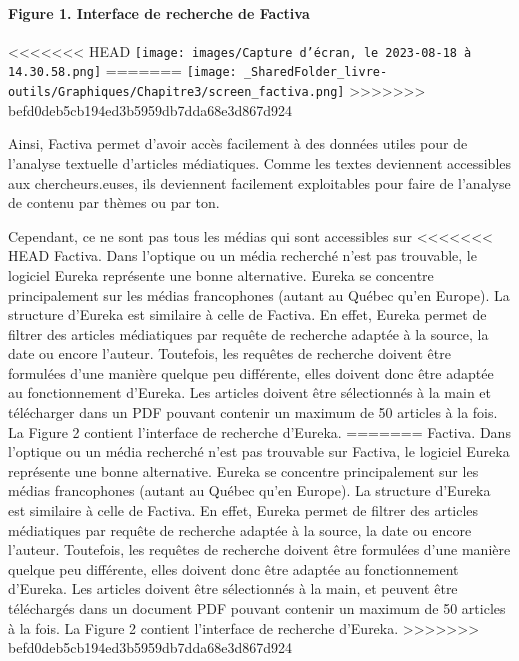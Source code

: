 \documentclass[
  letterpaper,
]{scrbook}
\let\oldparagraph\paragraph
\renewcommand{\paragraph}[1]{\oldparagraph{#1}\mbox{}}
\begin{document}
\hypertarget{figure-1.-interface-de-recherche-de-factiva}{%
\paragraph{Figure 1. Interface de recherche de
Factiva}\label{figure-1.-interface-de-recherche-de-factiva}}

<<<<<<< HEAD
\texttt{[image: images/Capture d’écran, le 2023-08-18 à 14.30.58.png]}
=======
\texttt{[image: \_SharedFolder\_livre-outils/Graphiques/Chapitre3/screen\_factiva.png]}
>>>>>>> befd0deb5cb194ed3b5959db7dda68e3d867d924

Ainsi, Factiva permet d'avoir accès facilement à des données utiles pour
de l'analyse textuelle d'articles médiatiques. Comme les textes
deviennent accessibles aux chercheurs.euses, ils deviennent facilement
exploitables pour faire de l'analyse de contenu par thèmes ou par ton.

Cependant, ce ne sont pas tous les médias qui sont accessibles sur
<<<<<<< HEAD
Factiva. Dans l'optique ou un média recherché n'est pas trouvable, le
logiciel Eureka représente une bonne alternative. Eureka se concentre
principalement sur les médias francophones (autant au Québec qu'en
Europe). La structure d'Eureka est similaire à celle de Factiva. En
effet, Eureka permet de filtrer des articles médiatiques par requête de
recherche adaptée à la source, la date ou encore l'auteur. Toutefois,
les requêtes de recherche doivent être formulées d'une manière quelque
peu différente, elles doivent donc être adaptée au fonctionnement
d'Eureka. Les articles doivent être sélectionnés à la main et
télécharger dans un PDF pouvant contenir un maximum de 50 articles à la
fois. La Figure 2 contient l'interface de recherche d'Eureka.
=======
Factiva. Dans l'optique ou un média recherché n'est pas trouvable sur
Factiva, le logiciel Eureka représente une bonne alternative. Eureka se
concentre principalement sur les médias francophones (autant au Québec
qu'en Europe). La structure d'Eureka est similaire à celle de Factiva.
En effet, Eureka permet de filtrer des articles médiatiques par requête
de recherche adaptée à la source, la date ou encore l'auteur. Toutefois,
les requêtes de recherche doivent être formulées d'une manière quelque
peu différente, elles doivent donc être adaptée au fonctionnement
d'Eureka. Les articles doivent être sélectionnés à la main, et peuvent
être téléchargés dans un document PDF pouvant contenir un maximum de 50
articles à la fois. La Figure 2 contient l'interface de recherche
d'Eureka.
>>>>>>> befd0deb5cb194ed3b5959db7dda68e3d867d924
\end{document}
